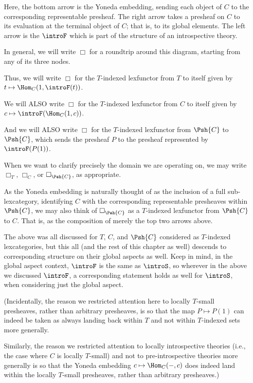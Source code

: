 Here, the bottom arrow is the Yoneda embedding, sending each object of $C$ to the corresponding representable presheaf. The right arrow takes a presheaf on $C$ to its evaluation at the terminal object of $C$; that is, to its global elements. The left arrow is the $\introF$ which is part of the structure of an introspective theory.

\begin{definition}\label{BoxDefn}
In general, we will write $\Box$ for a roundtrip around this diagram, starting from any of its three nodes.

Thus, we will write $\Box$ for the $T$-indexed lexfunctor from $T$ to itself given by $t \mapsto \Hom_C(1, \introF(t))$.

We will ALSO write $\Box$ for the $T$-indexed lexfunctor from $C$ to itself given by $c \mapsto \introF(\Hom_C(1, c))$.

And we will ALSO write $\Box$ for the $T$-indexed lexfunctor from $\Psh{C}$ to $\Psh{C}$, which sends the presheaf $P$ to the presheaf represented by $\introF(P(1))$.

When we want to clarify precisely the domain we are operating on, we may write $\Box_T$, $\Box_C$, or $\Box_{\Psh{C}}$, as appropriate.

As the Yoneda embedding is naturally thought of as the inclusion of a full sub-lexcategory, identifying $C$ with the corresponding representable presheaves within $\Psh{C}$, we may also think of $\Box_{\Psh{C}}$ as a $T$-indexed lexfunctor from $\Psh{C}$ to $C$. That is, as the composition of merely the top two arrows above.
\end{definition}

The above was all discussed for $T$, $C$, and $\Psh{C}$ considered as $T$-indexed lexcategories, but this all (and the rest of this chapter as well) descends to corresponding structure on their global aspects as well. Keep in mind, in the global aspect context, $\introF$ is the same as $\introS$, so wherever in the above we discussed $\introF$, a corresponding statement holds as well for $\introS$, when considering just the global aspect.

\bigskip
(Incidentally, the reason we restricted attention here to locally $T$-small presheaves, rather than arbitrary presheaves, is so that the map $P \mapsto P(1)$ can indeed be taken as always landing back within $T$ and not within $T$-indexed sets more generally.

Similarly, the reason we restricted attention to locally introspective theories (i.e., the case where $C$ is locally $T$-small) and not to pre-introspective theories more generally is so that the Yoneda embedding $c \mapsto \Hom_C(-, c)$ does indeed land within the locally $T$-small presheaves, rather than arbitrary presheaves.)

